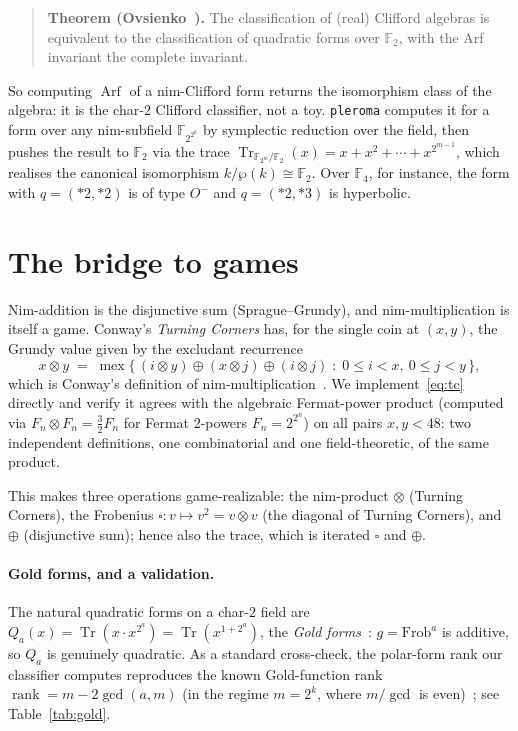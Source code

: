 \documentclass[11pt]{article}
\theoremstyle{definition}
\newcommand{\F}{\mathbb{F}}
\newcommand{\Tr}{\operatorname{Tr}}
\newcommand{\Arf}{\operatorname{Arf}}
\newcommand{\nimmul}{\otimes}
\begin{document}
\begin{quotation}
\noindent\textbf{Theorem (Ovsienko~\cite{Ovsienko16}).} The classification of
(real) Clifford algebras is equivalent to the classification of quadratic forms
over $\F_2$, with the Arf invariant the complete invariant.
\end{quotation}

\noindent
So computing $\Arf$ of a nim-Clifford form returns the isomorphism class of the
algebra: it is the char-$2$ Clifford classifier, not a toy. \texttt{pleroma}
computes it for a form over any nim-subfield $\F_{2^{2^k}}$ by symplectic
reduction over the field, then pushes the result to $\F_2$ via the trace
$\Tr_{\F_{2^m}/\F_2}(x)=x+x^2+\cdots+x^{2^{m-1}}$, which realises the canonical
isomorphism $k/\wp(k)\cong\F_2$. Over $\F_4$, for instance, the form with
$q=(\ast 2,\ast 2)$ is of type $O^-$ and $q=(\ast 2,\ast 3)$ is hyperbolic.

\section{The bridge to games}

Nim-addition is the disjunctive sum (Sprague--Grundy), and nim-multiplication is
itself a game. Conway's \emph{Turning Corners} has, for the single coin at
$(x,y)$, the Grundy value given by the excludant recurrence
\begin{equation}\label{eq:tc}
  x \nimmul y \;=\; \operatorname{mex}\bigl\{\,(i\nimmul y)\oplus(x\nimmul j)\oplus(i\nimmul j)
        \;:\; 0\le i<x,\ 0\le j<y \,\bigr\},
\end{equation}
which is Conway's definition of nim-multiplication~\cite{Conway76,WW}. We
implement~\eqref{eq:tc} directly and verify it agrees with the algebraic
Fermat-power product (computed via $F_n\nimmul F_n=\tfrac32 F_n$ for Fermat
$2$-powers $F_n=2^{2^n}$) on all pairs $x,y<48$: two independent definitions,
one combinatorial and one field-theoretic, of the same product.

This makes three operations game-realizable: the nim-product $\nimmul$ (Turning
Corners), the Frobenius $\square\colon v\mapsto v^2 = v\nimmul v$ (the diagonal
of Turning Corners), and $\oplus$ (disjunctive sum); hence also the trace, which
is iterated $\square$ and $\oplus$.

\paragraph{Gold forms, and a validation.}
The natural quadratic forms on a char-$2$ field are
$Q_a(x)=\Tr\!\left(x\cdot x^{2^a}\right)=\Tr\!\left(x^{1+2^a}\right)$, the
\emph{Gold forms}~\cite{Gold68}: $g=\mathrm{Frob}^a$ is additive, so $Q_a$ is
genuinely quadratic. As a standard cross-check, the polar-form rank our
classifier computes reproduces the known Gold-function rank
$\operatorname{rank}=m-2\gcd(a,m)$ (in the regime $m=2^k$, where $m/\gcd$ is
even)~\cite{LN}; see Table~\ref{tab:gold}.
\end{document}
